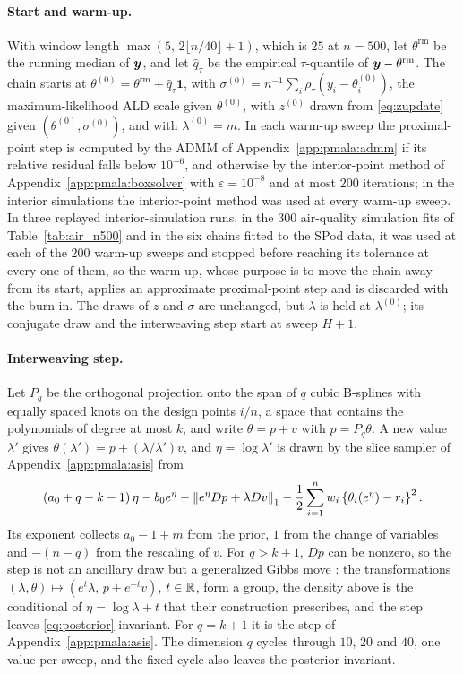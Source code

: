 \paragraph{Start and warm-up.} With window length $\max(5,\,2\lfloor n/40\rfloor+1)$, which is $25$ at $n = 500$, let $\theta^{\mathrm{rm}}$ be the running median of $\bm{y}$, and let $\hat q_\tau$ be the empirical $\tau$-quantile of $\bm{y} - \theta^{\mathrm{rm}}$. The chain starts at $\theta^{(0)} = \theta^{\mathrm{rm}} + \hat q_\tau\mathbf 1$, with $\sigma^{(0)} = n^{-1}\sum_i\rho_\tau(y_i - \theta^{(0)}_i)$, the maximum-likelihood ALD scale given $\theta^{(0)}$, with $z^{(0)}$ drawn from \eqref{eq:zupdate} given $(\theta^{(0)}, \sigma^{(0)})$, and with $\lambda^{(0)} = m$. In each warm-up sweep the proximal-point step is computed by the ADMM of Appendix~\ref{app:pmala:admm} if its relative residual falls below $10^{-6}$, and otherwise by the interior-point method of Appendix~\ref{app:pmala:boxsolver} with $\varepsilon = 10^{-8}$ and at most $200$ iterations; in the interior simulations the interior-point method was used at every warm-up sweep. In three replayed interior-simulation runs, in the $300$ air-quality simulation fits of Table~\ref{tab:air_n500} and in the six chains fitted to the SPod data, it was used at each of the $200$ warm-up sweeps and stopped before reaching its tolerance at every one of them, so the warm-up, whose purpose is to move the chain away from its start, applies an approximate proximal-point step and is discarded with the burn-in. The draws of $z$ and $\sigma$ are unchanged, but $\lambda$ is held at $\lambda^{(0)}$; its conjugate draw and the interweaving step start at sweep $H + 1$.

\paragraph{Interweaving step.} Let $P_q$ be the orthogonal projection onto the span of $q$ cubic B-splines with equally spaced knots on the design points $i/n$, a space that contains the polynomials of degree at most $k$, and write $\theta = p + v$ with $p = P_q\theta$. A new value $\lambda'$ gives $\theta(\lambda') = p + (\lambda/\lambda')v$, and $\eta = \log\lambda'$ is drawn by the slice sampler of Appendix~\ref{app:pmala:asis} from
\[
(a_0 + q - k - 1)\,\eta - b_0 e^{\eta} - \left\lVert e^{\eta}Dp + \lambda Dv\right\rVert_1 - \frac12\sum_{i=1}^n w_i\left\{\theta_i(e^{\eta}) - r_i\right\}^2 .
\]
Its exponent collects $a_0 - 1 + m$ from the prior, $1$ from the change of variables and $-(n - q)$ from the rescaling of $v$. For $q > k+1$, $Dp$ can be nonzero, so the step is not an ancillary draw but a generalized Gibbs move \citep{liu2000generalised}: the transformations $(\lambda, \theta) \mapsto (e^{t}\lambda,\, p + e^{-t}v)$, $t \in \mathbb{R}$, form a group, the density above is the conditional of $\eta = \log\lambda + t$ that their construction prescribes, and the step leaves \eqref{eq:posterior} invariant. For $q = k+1$ it is the step of Appendix~\ref{app:pmala:asis}. The dimension $q$ cycles through $10$, $20$ and $40$, one value per sweep, and the fixed cycle also leaves the posterior invariant.

